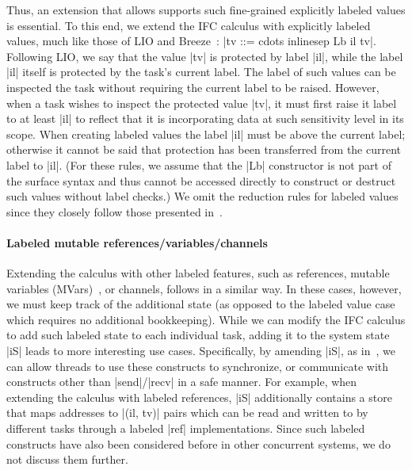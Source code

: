 Thus, an extension that allows supports such fine-grained explicitly
labeled values is essential.
%
To this end, we extend the IFC calculus with explicitly labeled
values, much like those of LIO and
Breeze~\cite{lio, Hritcu:2013:YIB:2497621.2498098}: |tv ::= cdots
inlinesep Lb il tv|.
%
Following LIO, we say that the value |tv| is protected by label |il|,
while the label |il| itself is protected by the task's current label.
%
%
The label of such values can be inspected the task without
requiring the current label to be raised.
%
However, when a task wishes to inspect the protected value |tv|, it
must first raise it label to at least |il| to reflect that it is
incorporating data at such sensitivity level in its scope.
%
When creating labeled values the label |il| must be above
the current label; otherwise it cannot be said that protection has
been transferred from the current label to |il|.
%
(For these rules, we assume that the |Lb| constructor is not part of
the surface syntax and thus cannot be accessed directly to construct
or destruct such values without label checks.)
% 
We omit the reduction rules for labeled values since they closely
follow those presented in~\cite{lio}.

\paragraph{Labeled mutable references/variables/channels}
%
Extending the calculus with other labeled features, such as
references, mutable variables (MVars)~\cite{CH96}, or channels,
follows in a similar way.
%
In these cases, however, we must keep track of the additional state
(as opposed to the labeled value case which requires no additional
bookkeeping).
%
While we can modify the IFC calculus to add such labeled state to each
individual task, adding it to the system state |iS| leads to more
interesting use cases.
%
Specifically, by amending |iS|, as in~\cite{lio,
stefan:addressing-covert}, we can allow threads to use these
constructs to synchronize, or communicate with constructs other than
|send|/|recv| in a safe manner.
%
For example, when extending the calculus with labeled references, |iS|
additionally contains a store that maps addresses to |(il, tv)| pairs
which can be read and written to by different tasks through a labeled
|ref| implementations.
%
Since such labeled constructs have also been considered before in other
concurrent systems, we do not discuss them further.

